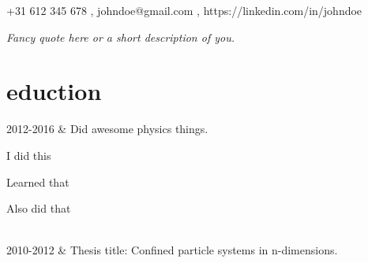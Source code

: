 \documentclass[]{cv-roald}
\begin{document}
\pagestyle{empty} %

{\faMobile \hspace{\FAspace} +31 612 345 678 \sep \faEnvelope \hspace{\FAspace} johndoe@gmail.com \sep \faLinkedinSquare \hspace{\FAspace} https://linkedin.com/in/johndoe
}

\textit{Fancy quote here or a short description of you.}

\section*{eduction}
\begin{tabularcv}
    2012-2016   &   
                    \newline Did awesome physics things.
                    \begin{tabitemize}
                        \item I did this
                        \item Learned that
                        \item Also did that
                    \end{tabitemize} 
                    \\[\vspacepar] %
    2010-2012   &   
                    \newline Thesis title: Confined particle systems in n-dimensions.
\end{tabularcv}
\end{document}
